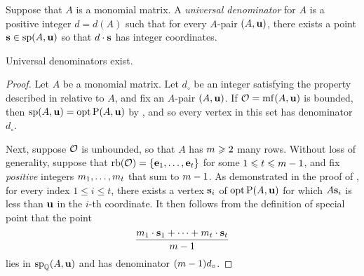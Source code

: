 \documentclass[11pt]{amsart}
\newcommand{\denom}{d}
\begin{document}

\begin{definition}
   \label{universal denominator: D}
   Suppose that $A$ is a monomial matrix.
   A \emph{universal denominator} for $A$ is a positive integer $\denom = \denom(A)$ such that for every $A$-pair $(A, \mathbf{u})$, there exists a point $\mathbf{s} \in \operatorname{sp}(A, \mathbf{u})$ so that $\denom \cdot \vv{s}$ has integer coordinates.
\end{definition}

\begin{theorem}
\label{universal-denominators-exist:  T}
Universal denominators exist.
\end{theorem}

\begin{proof}
   Let $A$ be a monomial matrix.
   Let $\denom_{\circ}$ be an integer satisfying the property described in  relative to $A$, and fix an $A$-pair $(A, \mathbf{u})$.
   If $\mathcal{O} = \operatorname{mf}(A, \mathbf{u})$ is bounded, then $\operatorname{sp}(A, \mathbf{u}) = \operatorname{opt} \mathrm{P}(A, \mathbf{u})$ by , and so every vertex in this set has denominator~$\denom_{\circ}$.

   Next, suppose $\mathcal{O}$ is unbounded, so that $A$ has $m \geqslant 2$ many rows.
   Without loss of generality, suppose that $\operatorname{rb}(\mathcal{O}) = \{ \mathbf{e}_1, \ldots, \mathbf{e}_t \}$ for some $1 \leqslant t \leqslant m-1$, and fix \emph{positive} integers $m_1, \ldots, m_t$ that sum to $m-1$.
   As demonstrated in the  proof of , for every index  $1 \leq i \leq t$, there exists a vertex $\mathbf{s}_i$ of $\operatorname{opt} \mathrm{P}(A, \mathbf{u})$ for which $A \mathbf{s}_i$ is less than $\mathbf{u}$ in the $i$-th coordinate.
   It then follows from the definition of special point that the point
   \[ \frac{ m_1 \cdot \mathbf{s}_1 + \cdots + m_t \cdot  \mathbf{s}_t}{m-1}  \]
   lies in $\operatorname{sp}_{\mathbb{Q}}(A, \mathbf{u})$ and has denominator $(\numvars-1)\denom_{\circ}$.
\end{proof}
\end{document}
